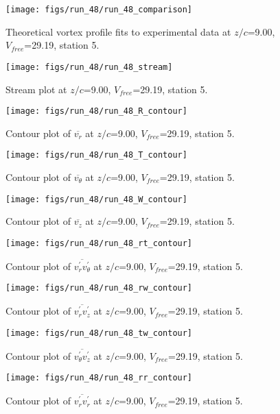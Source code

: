 \begin{figure}[H]
\centering
\texttt{[image: figs/run\_48/run\_48\_comparison]}
\caption{Theoretical vortex profile fits to experimental data at $z/c$=9.00, $V_{free}$=29.19, station 5.}
\end{figure}


\begin{figure}[H]
\centering
\texttt{[image: figs/run\_48/run\_48\_stream]}
\caption{Stream plot at $z/c$=9.00, $V_{free}$=29.19, station 5.}
\end{figure}


\begin{figure}[H]
\centering
\texttt{[image: figs/run\_48/run\_48\_R\_contour]}
\caption{Contour plot of $\overline{v_{r}}$ at $z/c$=9.00, $V_{free}$=29.19, station 5.}
\end{figure}


\begin{figure}[H]
\centering
\texttt{[image: figs/run\_48/run\_48\_T\_contour]}
\caption{Contour plot of $\overline{v_{\theta}}$ at $z/c$=9.00, $V_{free}$=29.19, station 5.}
\end{figure}


\begin{figure}[H]
\centering
\texttt{[image: figs/run\_48/run\_48\_W\_contour]}
\caption{Contour plot of $\overline{v_{z}}$ at $z/c$=9.00, $V_{free}$=29.19, station 5.}
\end{figure}


\begin{figure}[H]
\centering
\texttt{[image: figs/run\_48/run\_48\_rt\_contour]}
\caption{Contour plot of $\overline{v_{r}^{\prime} v_{\theta}^{\prime}}$ at $z/c$=9.00, $V_{free}$=29.19, station 5.}
\end{figure}


\begin{figure}[H]
\centering
\texttt{[image: figs/run\_48/run\_48\_rw\_contour]}
\caption{Contour plot of $\overline{v_{r}^{\prime} v_{z}^{\prime}}$ at $z/c$=9.00, $V_{free}$=29.19, station 5.}
\end{figure}


\begin{figure}[H]
\centering
\texttt{[image: figs/run\_48/run\_48\_tw\_contour]}
\caption{Contour plot of $\overline{v_{\theta}^{\prime} v_{z}^{\prime}}$ at $z/c$=9.00, $V_{free}$=29.19, station 5.}
\end{figure}


\begin{figure}[H]
\centering
\texttt{[image: figs/run\_48/run\_48\_rr\_contour]}
\caption{Contour plot of $\overline{v_{r}^{\prime} v_{r}^{\prime}}$ at $z/c$=9.00, $V_{free}$=29.19, station 5.}
\end{figure}


